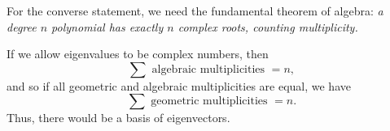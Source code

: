 \documentclass{problemset}
\begin{document}
\begin{parts}
\begin{solution}
				For the converse statement, we need the fundamental theorem of algebra:\emph{
					a degree $n$ polynomial has exactly $n$ complex roots, counting multiplicity.}

				If we allow eigenvalues to be complex numbers, then
				\[
					\sum \text{ algebraic multiplicities }= n,
				\]
				and so if all geometric and algebraic multiplicities are equal, we have
				\[
					\sum \text{ geometric multiplicities } = n.
				\]
				Thus, there would be a basis of eigenvectors.
			\end{solution}
	\end{parts}
\end{document}
